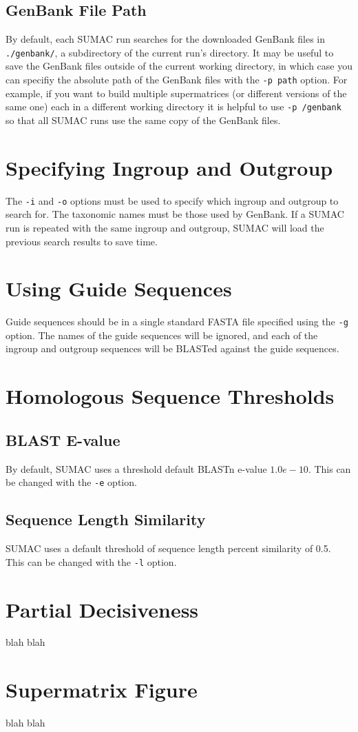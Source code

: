 \documentclass[10pt]{report}
\begin{document}
\subsection{GenBank File Path}

By default, each SUMAC run searches for the downloaded GenBank files
in \verb|./genbank/|, a subdirectory of the current run's directory.
It may be useful to save the GenBank files outside of the current working
directory, in which case 
you can specifiy the absolute path of the GenBank files with the \verb|-p path| option.
For example, if you want to build
multiple supermatrices (or different versions of the same one) each in a different working directory
it is helpful
to use \verb|-p /genbank| so that all SUMAC runs use the same copy of the GenBank files.

\section{Specifying Ingroup and Outgroup}

The \verb|-i| and \verb|-o| options must be used to specify which ingroup and
outgroup to search for. The taxonomic names must be those used by GenBank.
If a SUMAC run is repeated with the same ingroup and outgroup, SUMAC
will load the previous search results to save time.

\section{Using Guide Sequences}

Guide sequences should be in a single standard FASTA file specified
using the \verb|-g| option. The names of the
guide sequences will be ignored, and each of the ingroup and outgroup 
sequences will be BLASTed against the guide sequences.

\section{Homologous Sequence Thresholds}

\subsection{BLAST E-value}
By default, SUMAC uses a threshold default BLASTn e-value $1.0e-10$.
This can be changed with the \verb|-e| option.

\subsection{Sequence Length Similarity}
SUMAC uses a default threshold of sequence length percent similarity
of 0.5. This can be changed with the \verb|-l| option.

\section{Partial Decisiveness}
blah blah

\section{Supermatrix Figure}
blah blah
\end{document}
